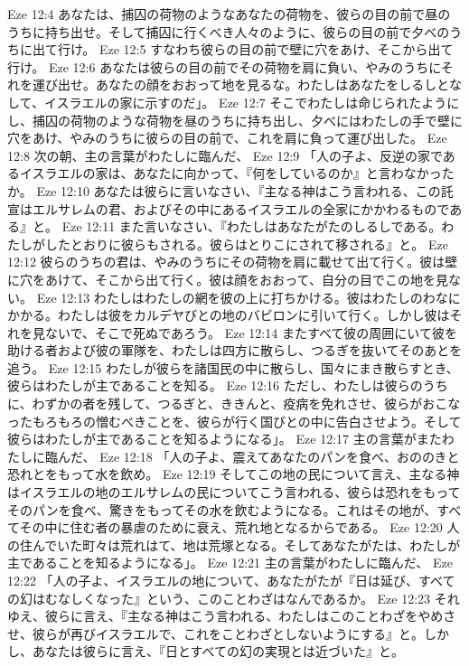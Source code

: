 Eze 12:4  あなたは、捕囚の荷物のようなあなたの荷物を、彼らの目の前で昼のうちに持ち出せ。そして捕囚に行くべき人々のように、彼らの目の前で夕べのうちに出て行け。
Eze 12:5  すなわち彼らの目の前で壁に穴をあけ、そこから出て行け。
Eze 12:6  あなたは彼らの目の前でその荷物を肩に負い、やみのうちにそれを運び出せ。あなたの顔をおおって地を見るな。わたしはあなたをしるしとなして、イスラエルの家に示すのだ」。
Eze 12:7  そこでわたしは命じられたようにし、捕囚の荷物のような荷物を昼のうちに持ち出し、夕べにはわたしの手で壁に穴をあけ、やみのうちに彼らの目の前で、これを肩に負って運び出した。
Eze 12:8  次の朝、主の言葉がわたしに臨んだ、
Eze 12:9  「人の子よ、反逆の家であるイスラエルの家は、あなたに向かって、『何をしているのか』と言わなかったか。
Eze 12:10  あなたは彼らに言いなさい、『主なる神はこう言われる、この託宣はエルサレムの君、およびその中にあるイスラエルの全家にかかわるものである』と。
Eze 12:11  また言いなさい、『わたしはあなたがたのしるしである。わたしがしたとおりに彼らもされる。彼らはとりこにされて移される』と。
Eze 12:12  彼らのうちの君は、やみのうちにその荷物を肩に載せて出て行く。彼は壁に穴をあけて、そこから出て行く。彼は顔をおおって、自分の目でこの地を見ない。
Eze 12:13  わたしはわたしの網を彼の上に打ちかける。彼はわたしのわなにかかる。わたしは彼をカルデヤびとの地のバビロンに引いて行く。しかし彼はそれを見ないで、そこで死ぬであろう。
Eze 12:14  またすべて彼の周囲にいて彼を助ける者および彼の軍隊を、わたしは四方に散らし、つるぎを抜いてそのあとを追う。
Eze 12:15  わたしが彼らを諸国民の中に散らし、国々にまき散らすとき、彼らはわたしが主であることを知る。
Eze 12:16  ただし、わたしは彼らのうちに、わずかの者を残して、つるぎと、ききんと、疫病を免れさせ、彼らがおこなったもろもろの憎むべきことを、彼らが行く国びとの中に告白させよう。そして彼らはわたしが主であることを知るようになる」。
Eze 12:17  主の言葉がまたわたしに臨んだ、
Eze 12:18  「人の子よ、震えてあなたのパンを食べ、おののきと恐れとをもって水を飲め。
Eze 12:19  そしてこの地の民について言え、主なる神はイスラエルの地のエルサレムの民についてこう言われる、彼らは恐れをもってそのパンを食べ、驚きをもってその水を飲むようになる。これはその地が、すべてその中に住む者の暴虐のために衰え、荒れ地となるからである。
Eze 12:20  人の住んでいた町々は荒れはて、地は荒塚となる。そしてあなたがたは、わたしが主であることを知るようになる」。
Eze 12:21  主の言葉がわたしに臨んだ、
Eze 12:22  「人の子よ、イスラエルの地について、あなたがたが『日は延び、すべての幻はむなしくなった』という、このことわざはなんであるか。
Eze 12:23  それゆえ、彼らに言え、『主なる神はこう言われる、わたしはこのことわざをやめさせ、彼らが再びイスラエルで、これをことわざとしないようにする』と。しかし、あなたは彼らに言え、『日とすべての幻の実現とは近づいた』と。
